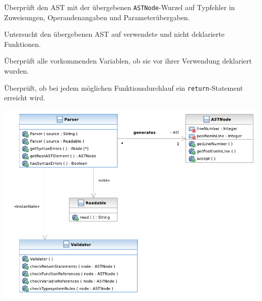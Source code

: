 \begin{description}
    Überprüft den AST mit der übergebenen \texttt{ASTNode}-Wurzel auf Typfehler in Zuweisungen, Operandenangaben und Parameterübergaben.

    Untersucht den übergebenen AST auf verwendete und nicht deklarierte Funktionen.

    Überprüft alle vorkommenden Variablen, ob sie vor ihrer Verwendung deklariert wurden.

    Überprüft, ob bei jedem möglichen Funktionsdurchlauf ein \texttt{return}-Statement erreicht wird.
\end{description}

\includegraphics[width=\textwidth]{diagrams/parser_component.pdf}
